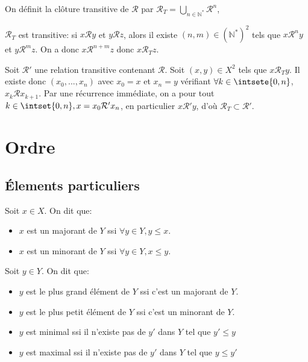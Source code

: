 \documentclass{scrartcl}
\begin{document}
			\semidef On définit la clôture transitive de $\mathcal{R}$ par $\mathcal{R}_T = \bigcup_{n\in\mathbb{N}^*} \mathcal{R}^n$,

			\begin{demo}
				\item $\mathcal{R}_T$ est transitive: si $x \mathcal{R} y$ et $y \mathcal{R} z$,
					alors il existe $(n,m) \in (\mathbb{N}^*)^2$ tels que $x \mathcal{R}^n y$ et $y \mathcal{R}^m z$.
					On a donc $x \mathcal{R}^{n+m} z$ donc $x \mathcal{R}_T z$.
				\item Soit $\mathcal{R'}$ une relation transitive contenant $\mathcal{R}$.
					Soit $(x,y) \in X^2$ tels que $x \mathcal{R}_T y$.
					Il existe donc $(x_0, ..., x_n)$ avec $x_0 = x$ et $x_n = y$ vérifiant 
					$\forall k \in \intsete{0,n}$, $x_k \mathcal{R} x_{k+1}$.
					Par une récurrence immédiate, on a pour tout $k \in \intset{0,n}, x = x_0 \mathcal{R}' x_n$,
					en particulier $x \mathcal{R}' y$, d'où $\mathcal{R}_T \subset \mathcal{R}'$.
			\end{demo}

	\section{Ordre}
		\subsection{Élements particuliers}
			Soit $x\in X$. On dit que:
			\begin{itemize}
				\item $x$ est un majorant de $Y$ ssi $\forall y \in Y, y\leq x$.
				\item $x$ est un minorant de $Y$ ssi $\forall y \in Y, x \leq y$.
			\end{itemize}
			Soit $y\in Y$. On dit que:
			\begin{itemize}
				\item $y$ est le plus grand élément de $Y$ ssi c'est un majorant de $Y$.
				\item $y$ est le plus petit élément de $Y$ ssi c'est un minorant de $Y$.
				\item $y$ est minimal ssi il n'existe pas de $y'$ dans $Y$ tel que $y'\leq y$
				\item $y$ est maximal ssi il n'existe pas de $y'$ dans $Y$ tel que $y\leq y'$
			\end{itemize}
			
\end{document}
